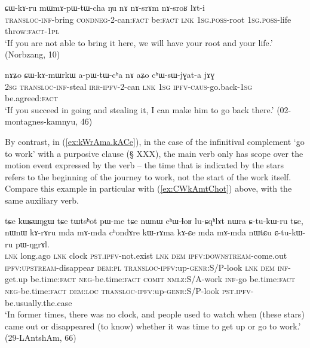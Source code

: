 \begin{exe}
\ex \label{ex:CWkAru}
\gll ɕɯ-kɤ-ru mɯ\redp{}mɤ-pɯ-tɯ-cha ŋu nɤ nɤ-srɤm nɤ-sroʁ lɤt-i \\
\textsc{transloc}-\textsc{inf}-bring \textsc{cond}\redp{}\textsc{neg}-2-can:\textsc{fact} be:\textsc{fact} \textsc{lnk} \textsc{1sg.poss}-root \textsc{1sg.poss}-life throw:\textsc{fact}-\textsc{1pl} \\ 
\glt `If you are not able to bring it here, we will have your root and your life.' (Norbzang, 10)
\end{exe}

\begin{exe}
\ex \label{ex:CWkAmWrkW}
\gll nɤʑo ɕɯ-kɤ-mɯrkɯ a-pɯ-tɯ-cʰa nɤ aʑo cʰɯ-sɯ-jɣat-a jɤɣ \\
\textsc{2sg} \textsc{transloc}-\textsc{inf}-steal \textsc{irr}-\textsc{ipfv}-2-can \textsc{lnk} \textsc{1sg} \textsc{ipfv}-\textsc{caus}-go.back-\textsc{1sg} be.agreed:\textsc{fact} \\
\glt `If you succeed in going and stealing it, I can make him to go back there.' (02-montagnes-kamnyu, 46)
\end{exe}

 
By contrast, in  (\ref{ex:kWrAma.kACe}), in the case of the infinitival complement  `go to work' with a purposive clause  (§ XXX), the main verb  only has scope over the motion event expressed by the verb  -- the time that is indicated by the stars refers to the beginning of the journey to work, not the start of the work itself. Compare this example in particular with (\ref{ex:CWkAmtChot}) above, with the same auxiliary verb.
 
 \begin{exe}
\ex \label{ex:kWrAma.kACe}
\gll  tɕe kɯɕɯŋgɯ tɕe tɯtsʰot pɯ-me tɕe  nɯnɯ cʰɯ-ɬoʁ lu-ɕqʰlɤt nɯra ɕ-tu-kɯ-ru tɕe, nɯnɯ kɤ-rɤru mda mɤ-mda cʰondɤre kɯ-rɤma kɤ-ɕe mda mɤ-mda nɯtɕu ɕ-tu-kɯ-ru pɯ-ŋgrɤl. \\
 \textsc{lnk} long.ago \textsc{lnk} clock \textsc{pst}.\textsc{ipfv}-not.exist \textsc{lnk} \textsc{dem} \textsc{ipfv}:\textsc{downstream}-come.out \textsc{ipfv}:\textsc{upstream}-disappear \textsc{dem}:\textsc{pl} \textsc{transloc}-\textsc{ipfv}:up-\textsc{genr}:S/P-look \textsc{lnk} \textsc{dem} \textsc{inf}-get.up be.time:\textsc{fact} \textsc{neg}-be.time:\textsc{fact} \textsc{comit} \textsc{nmlz}:S/A-work \textsc{inf}-go be.time:\textsc{fact} \textsc{neg}-be.time:\textsc{fact} \textsc{dem}:\textsc{loc} \textsc{transloc}-\textsc{ipfv}:up-\textsc{genr}:S/P-look \textsc{pst}.\textsc{ipfv}-be.usually.the.case  \\
 \glt  `In former times, there was no clock, and people used to watch when (these stars) came out or disappeared (to know) whether it was time to get up or go to work.' (29-LAntshAm, 66)
  \end{exe}
  
